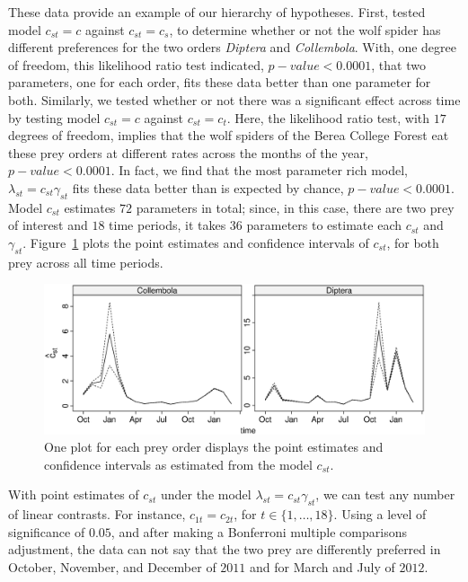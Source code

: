 These data provide an example of our hierarchy of hypotheses.  First, tested model $c_{st} = c$ against $c_{st} = c_s$, to determine whether or not the wolf spider has different preferences for the two orders \textit{Diptera}  and \textit{Collembola}.  With, one degree of freedom, this likelihood ratio test indicated, $p-value < 0.0001$,  that two parameters, one for each order, fits these data better than one parameter for both.  Similarly, we tested whether or not there was a significant effect across time by testing model $c_{st} = c$ against $c_{st} = c_t$.  Here, the likelihood ratio test, with $17$ degrees of freedom, implies that the wolf spiders of the Berea College Forest eat these prey orders at different rates across the months of the year, $p-value < 0.0001$.  In fact, we find that the most parameter rich model, $\lambda_{st} = c_{st} \gamma_{st}$ fits these data better than is expected by chance, $p-value < 0.0001$.  Model $c_{st}$ estimates $72$ parameters in total; since, in this case, there are two prey of interest and $18$ time periods, it takes $36$ parameters to estimate each $c_{st}$ and $\gamma_{st}$.  Figure~\ref{fig:cst} plots the point estimates and confidence intervals of $c_{st}$, for both prey across all time periods.  

\begin{figure}
  \centering
  \includegraphics[scale=0.5]{cst}
  \caption{One plot for each prey order displays the point estimates and confidence intervals as estimated from the model $c_{st}$.}
  \label{fig:cst}
\end{figure}

With point estimates of $c_{st}$ under the model $\lambda_{st} = c_{st} \gamma_{st}$, we can test any number of linear contrasts.  For instance, $c_{1t} = c_{2t}$, for $t \in \{1, \ldots, 18\}$.  Using a level of significance of $0.05$, and after making a Bonferroni multiple comparisons adjustment, the data can not say that the two prey are differently preferred in October, November, and December of $2011$ and for March and July of $2012$.  


